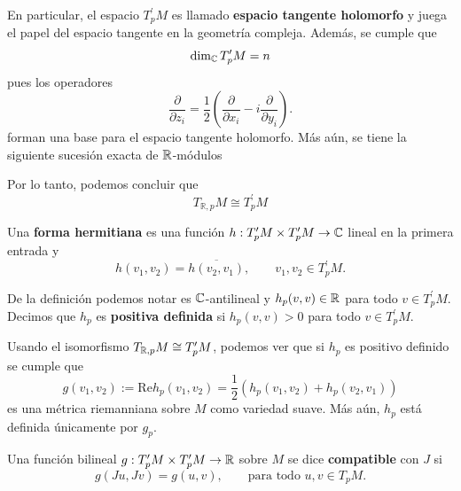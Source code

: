 En particular, el espacio $T_{p}^\prime M$ es llamado \textbf{espacio tangente holomorfo} y juega el papel del espacio tangente en la geometría compleja. Además, se cumple que
\begin{equation*}
	\dim_{\mathbb{C}} T_{p}^\prime M=n
\end{equation*}
pues los operadores 
\begin{equation*}
	\frac{\partial }{\partial z_i}=\frac{1}{2}\left( \frac{\partial }{\partial x_i}-i\frac{\partial }{\partial y_i}\right).
\end{equation*}
forman una base para el espacio tangente holomorfo. Más aún, se tiene la siguiente sucesión exacta de $\mathbb{R}$-módulos
\begin{center}
\end{center}
Por lo tanto, podemos concluir que
\begin{equation*}
	T_{\mathbb{R},p}M\cong T_p^\prime M
\end{equation*}
\begin{definition}
	Una \textbf{forma hermitiana} es una función $h:T^\prime_pM\times T^\prime_pM\to\mathbb{C}$ lineal en la primera entrada y 
	\begin{equation*}
		h(v_1,v_2)=\overline{h(v_2,v_1)},\qquad v_1,v_2\in T^\prime_pM.
	\end{equation*}
\end{definition}
De la definición podemos notar es $\mathbb{C}$-antilineal y $h_p(v,v)\in\mathbb{R}$ para todo $v\in T^\prime_pM$. Decimos que $h_p$ es \textbf{positiva definida} si $h_p(v,v)>0$ para todo $v\in T^\prime_pM$.

Usando el isomorfismo $T_{\mathbb{R},p}M\cong T^\prime_pM$, podemos ver que si $h_p$ es positivo definido se cumple que
\begin{equation*}
	g(v_1,v_2):=\mathrm{Re}h_p(v_1,v_2)=\frac{1}{2}(h_p(v_1,v_2)+h_p(v_2,v_1))
\end{equation*}
es una métrica riemanniana sobre $M$ como variedad suave. Más aún, $h_p$ está definida únicamente por $g_p$.

\begin{definition}
	Una función bilineal $g:T^\prime_pM\times T^\prime_pM\to\mathbb{R}$ sobre $M$ se dice \textbf{compatible} con $J$ si
	\begin{equation*}
		g(Ju,Jv)=g(u,v),\qquad\text{para todo }u,v\in T_pM.
	\end{equation*}
\end{definition}

